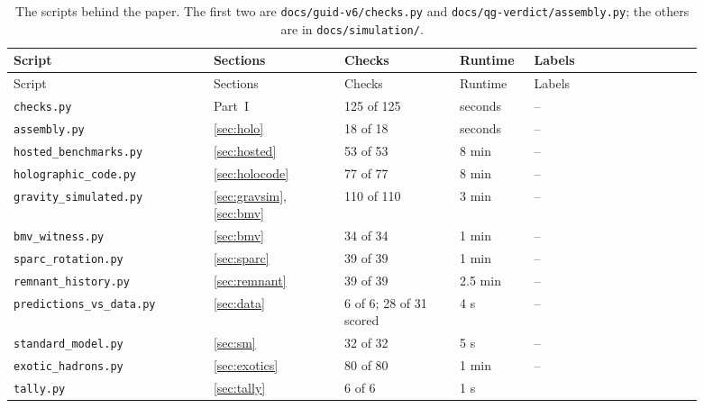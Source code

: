 \begin{center}\small
\begin{longtable}{@{}P{0.26\linewidth}P{0.17\linewidth}P{0.15\linewidth}P{0.09\linewidth}P{0.22\linewidth}@{}}
\caption{The scripts behind the paper. The first two are \texttt{docs/guid-v6/checks.py} and \texttt{docs/qg-verdict/assembly.py}; the
others are in \texttt{docs/simulation/}.}\label{tab:scripts}\\
\toprule
Script & Sections & Checks & Runtime & Labels \\
\midrule
\endfirsthead
\toprule
Script & Sections & Checks & Runtime & Labels \\
\midrule
\endhead
\bottomrule
\endfoot
\texttt{checks.py} & Part~I & 125 of 125 & seconds & -- \\
\texttt{assembly.py} & \ref{sec:holo} & 18 of 18 & seconds & -- \\
\texttt{hosted\_benchmarks.py} & \ref{sec:hosted} & 53 of 53 & 8 min & -- \\
\texttt{holographic\_code.py} & \ref{sec:holocode} & 77 of 77 & 8 min & -- \\
\texttt{gravity\_simulated.py} & \ref{sec:gravsim}, \ref{sec:bmv} & 110 of 110 & 3 min & -- \\
\texttt{bmv\_witness.py} & \ref{sec:bmv} & 34 of 34 & 1 min & -- \\
\texttt{sparc\_rotation.py} & \ref{sec:sparc} & 39 of 39 & 1 min & -- \\
\texttt{remnant\_history.py} & \ref{sec:remnant} & 39 of 39 & 2.5 min & -- \\
\texttt{predictions\_vs\_data.py} & \ref{sec:data} & 6 of 6; 28 of 31 scored & 4 s & -- \\
\texttt{standard\_model.py} & \ref{sec:sm} & 32 of 32 & 5 s & -- \\
\texttt{exotic\_hadrons.py} & \ref{sec:exotics} & 80 of 80 & 1 min & -- \\
\texttt{tally.py} & \ref{sec:tally} & 6 of 6 & 1 s &  \\
\end{longtable}
\end{center}

